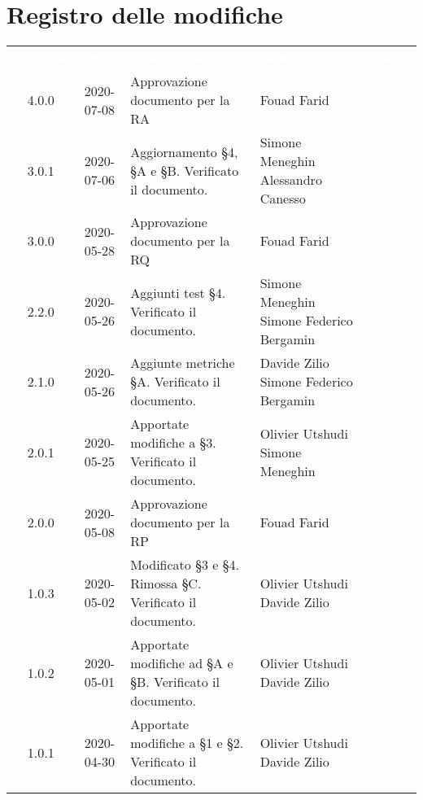 \section*{Registro delle modifiche}
{
	\centering
	\begin{longtable}{ c c  C{4cm}  C{3.5cm}  C{3.5cm} }
		\textcolor{white}{\textbf{Versione}} & \textcolor{white}{\textbf{Data}} & \textcolor{white}{\textbf{Descrizione}} & \textcolor{white}{\textbf{Nominativo}} & \textcolor{white}{\textbf{Ruolo}}\\	
		4.0.0 & 2020-07-08 & Approvazione documento per la RA & Fouad Farid &\RdP \\
		3.0.1 & 2020-07-06 & Aggiornamento \S 4, \S A e \S B. Verificato il documento. & Simone Meneghin \newline Alessandro Canesso & \prog \newline \ver{} \\
		3.0.0 & 2020-05-28 & Approvazione documento per la RQ & Fouad Farid &\RdP \\	
		2.2.0 & 2020-05-26 & Aggiunti test \S 4. Verificato il documento. & Simone Meneghin \newline Simone Federico Bergamin  & \prog \newline \ver{} \\
		2.1.0 & 2020-05-26 & Aggiunte metriche \S A. Verificato il documento. & Davide Zilio \newline Simone Federico Bergamin  & \prog \newline \ver{} \\
		2.0.1 & 2020-05-25 & Apportate modifiche a §3. Verificato il documento.& Olivier Utshudi \newline Simone Meneghin & \prog \newline \ver{} \\
		2.0.0 & 2020-05-08 & Approvazione documento per la RP & Fouad Farid &\RdP \\
		1.0.3 & 2020-05-02 & Modificato \S 3 e \S 4. Rimossa \S C. Verificato il documento. & Olivier Utshudi \newline Davide Zilio &\prog \newline \ver{}\\		
		1.0.2 & 2020-05-01 & Apportate modifiche ad \S A e \S B. Verificato il documento. & Olivier Utshudi \newline Davide Zilio &\prog \newline \ver{}\\
		1.0.1 & 2020-04-30 & Apportate modifiche a \S 1 e \S 2. Verificato il documento. & Olivier Utshudi \newline Davide Zilio &\prog \newline \ver{}\\

\end{longtable}}
